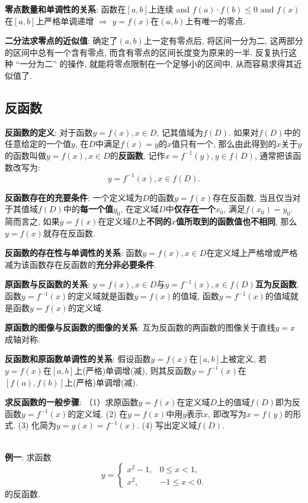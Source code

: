 \documentclass[8pt]{article}
\begin{document}
				\textbf{零点数量和单调性的关系}: 函数在$[a, b]$上连续 and $f(a) \cdot f(b) \leq 0$ and $f(x)$在$[a, b]$上严格单调递增 $\Rightarrow$ $y=f(x)$在$(a, b)$上有唯一的零点.

				\textbf{二分法求零点的近似值}: 确定了$(a, b)$上一定有零点后, 将区间一分为二, 这两部分的区间中总有一个含有零点, 而含有零点的区间长度变为原来的一半. 反复执行这种 “一分为二” 的操作, 就能将零点限制在一个足够小的区间中, 从而容易求得其近似值了.

		\newpage
		\subsection{反函数}
			\textbf{反函数的定义}: 对于函数$y=f(x), x\in D$, 记其值域为$f(D)$. 如果对$f(D)$中的任意给定的一个值$y$, 在$D$中满足$f(x)=y$的$x$值只有一个, 那么由此得到的$x$关于$y$的函数叫做$y=f(x), x\in D$的\textbf{反函数}, 记作$x=f^{-1}(y), y\in f(D)$, 通常把该函数改写为:$$y=f^{-1}(x), x\in f(D).$$

			\textbf{反函数存在的充要条件}: 一个定义域为$D$的函数$y=f(x)$存在反函数, 当且仅当对于其值域$f(D)$中的\textbf{每一个值$y_0$}, 在定义域$D$中\textbf{仅存在一个$x_0$}, 满足$f(x_0)=y_0$. 简而言之, 如果$y=f(x)$在定义域$D$上\textbf{不同的$x$值所取到的函数值也不相同}, 那么$y=f(x)$就存在反函数.

			\textbf{反函数的存在性与单调性的关系}: 函数$y=f(x), x\in D$在定义域上严格增或严格减为该函数存在反函数的\textbf{充分非必要条件}.

			\textbf{原函数与反函数的关系}: $y=f(x), x\in D$与$y=f^{-1}(x), x\in f(D)$\textbf{互为反函数}. 函数$y=f^{-1} (x)$的定义域就是函数$y=f(x)$的值域, 函数$y=f^{-1} (x)$的值域就是函数$y=f(x)$的定义域.

			\textbf{原函数的图像与反函数的图像的关系}: 互为反函数的两函数的图像关于直线$y=x$成轴对称.

			\textbf{反函数和原函数单调性的关系}: 假设函数$y=f(x)$在$[a, b]$上被定义, 若$y=f(x)$在$[a, b]$上(严格)单调增(减), 则其反函数$y=f^{-1}(x)$在$[f(a), f(b)]$上(严格)单调增(减).

			\textbf{求反函数的一般步骤}: （1）求原函数$y=f(x)$在定义域$D$上的值域$f(D)$即为反函数$y=f^{-1}(x)$的定义域. (2) 在$y=f(x)$中用$y$表示$x$, 即改写为$x=f(y)$的形式. (3) 化简为$y=g(x)=f^{-1}(x)$. (4) 写出定义域$f(D)$.

			~\\

			\textbf{例一}: 求函数$$y=\left\{\begin{array}{rl}x^2-1,&0\leq x<1,\\x^2,&-1\leq x<0.\end{array}\right.$$的反函数.
				~\\
\end{document}
